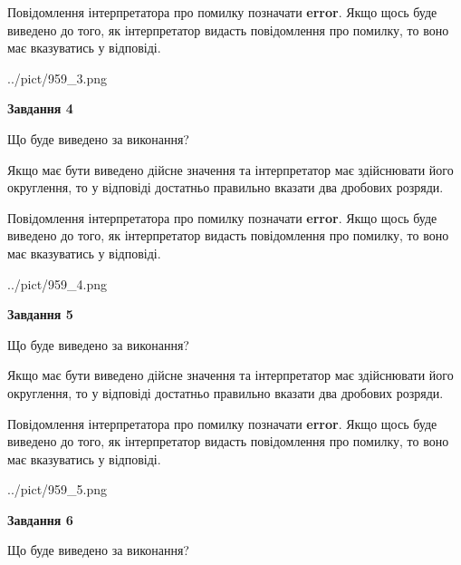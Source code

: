 \documentclass[12pt, ukrainian]{article}
\begin{document}
{\begin {Large}
Повідомлення інтерпретатора про помилку позначати \textbf{error}.
Якщо щось буде виведено до того, як інтерпретатор видасть повідомлення про помилку, 
то воно має вказуватись у відповіді. \par

\begin{center}
	{../pict/959_3.png}
\end{center}
\newpage

{\begin {center}\textbf{Завдання 4}\end {center}}\par
Що буде виведено за виконання? \par

Якщо має бути виведено дійсне значення та інтерпретатор має здійснювати його округлення, 
то у відповіді достатньо правильно вказати два дробових розряди.

Повідомлення інтерпретатора про помилку позначати \textbf{error}.
Якщо щось буде виведено до того, як інтерпретатор видасть повідомлення про помилку, 
то воно має вказуватись у відповіді. \par

\begin{center}
	{../pict/959_4.png}
\end{center}
\newpage

{\begin {center}\textbf{Завдання 5}\end {center}}\par
Що буде виведено за виконання? \par

Якщо має бути виведено дійсне значення та інтерпретатор має здійснювати його округлення, 
то у відповіді достатньо правильно вказати два дробових розряди.

Повідомлення інтерпретатора про помилку позначати \textbf{error}.
Якщо щось буде виведено до того, як інтерпретатор видасть повідомлення про помилку, 
то воно має вказуватись у відповіді. \par

\begin{center}
	{../pict/959_5.png}
\end{center}
\newpage

{\begin {center}\textbf{Завдання 6}\end {center}}\par
Що буде виведено за виконання? \par


\end{Large}}
\end{document}
